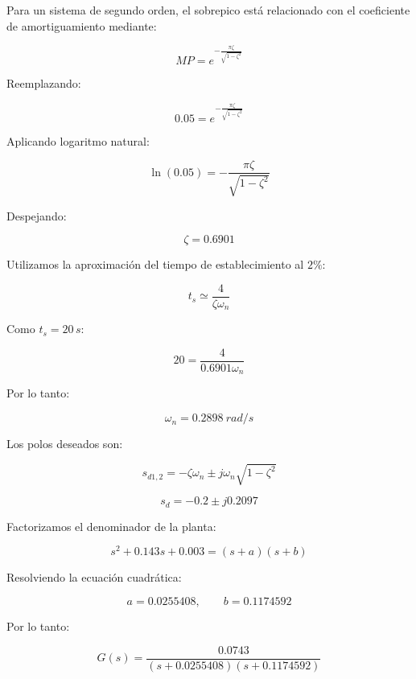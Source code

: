 \documentclass[10pt]{article}
\begin{document}
Para un sistema de segundo orden, el
sobrepico está relacionado con el
coeficiente de amortiguamiento mediante:

\begin{equation}
    MP=e^{-\frac{\pi\zeta}
    {\sqrt{1-\zeta^2}}}
\end{equation}

Reemplazando:

\[
0.05=e^{-\frac{\pi\zeta}
{\sqrt{1-\zeta^2}}}
\]

Aplicando logaritmo natural:

\[
\ln(0.05)=
-\frac{\pi\zeta}{\sqrt{1-\zeta^2}}
\]

Despejando:

\begin{equation}
    \boxed{\zeta=0.6901}
\end{equation}

Utilizamos la aproximación del tiempo
de establecimiento al $2\%$:

\begin{equation}
    t_s\simeq\frac{4}{\zeta\omega_n}
\end{equation}

Como $t_s=20\,s$:

\[
20=\frac{4}{0.6901\omega_n}
\]

Por lo tanto:

\begin{equation}
    \boxed{\omega_n=0.2898\ rad/s}
\end{equation}

Los polos deseados son:

\[
s_{d1,2}=
-\zeta\omega_n
\pm j\omega_n\sqrt{1-\zeta^2}
\]

\begin{equation}
    \boxed{s_d=-0.2\pm j0.2097}
\end{equation}

Factorizamos el denominador de la planta:

\[
s^2+0.143s+0.003=(s+a)(s+b)
\]

Resolviendo la ecuación cuadrática:

\[
a=0.0255408,
\qquad b=0.1174592
\]

Por lo tanto:

\begin{equation}
    \boxed{
    G(s)=\frac{0.0743}
    {(s+0.0255408)(s+0.1174592)}
    }
\end{equation}

\end{document}
